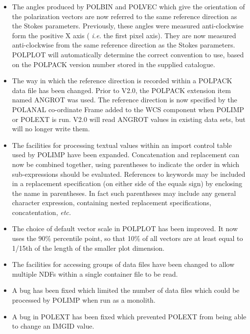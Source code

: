 \documentclass[twoside,11pt]{article}
\newcommand{\htmlref}[2]{#1}
\renewcommand{\_}{\texttt{\symbol{95}}}
\begin{document}
\begin{itemize}
\item The angles produced by \htmlref{POLBIN}{POLBIN} and
\htmlref{POLVEC}{POLVEC} which
give the orientation of the polarization vectors are now referred to the
same reference direction as the Stokes parameters. Previously, these
angles were measured anti-clockwise form the positive X axis (\emph{
i.e.} the first pixel axis). They are now measured anti-clockwise from
the same reference direction as the Stokes parameters.
\htmlref{POLPLOT}{POLPLOT}
will automatically determine the correct convention to use, based on the
POLPACK version number stored in the supplied catalogue.

\item The way in which the reference direction is recorded within a
POLPACK data file has been changed. Prior to V2.0, the POLPACK extension
item named ANGROT was used. The reference direction is now specified by
the POLANAL co-ordinate Frame added to the WCS component when
\htmlref{POLIMP}{POLIMP} or \htmlref{POLEXT}{POLIMP} is run. V2.0 will read 
ANGROT values in existing data sets, but will no longer write them.

\item The facilities for processing textual values within an import
control table used by \htmlref{POLIMP}{POLIMP} have been expanded.
Concatenation and replacement can now be combined together, using
parentheses to indicate the order in which sub-expressions should be
evaluated. References to keywords may be included in a replacement
specification (on either side of the equals sign) by enclosing the name 
in parentheses. In fact such parentheses may include any general
character expression, containing nested replacement specifications,
concatentation, \emph{etc.}

\item The choice of default vector scale in \htmlref{POLPLOT}{POLPLOT}
has been improved. It now uses the 90\% percentile point, so that 10\% of 
all vectors are at least equal to 1/15th of the length of the smaller plot
dimension.

\item The facilities for accessing groups of data files have been changed
to allow multiple NDFs within a single container file to be read. 

\item A bug has been fixed which limited the number of data files which 
could be processed by \htmlref{POLIMP}{POLIMP} when run as a monolith.

\item A bug in \htmlref{POLEXT}{POLEXT} has been fixed which prevented 
POLEXT from being able to change an IMGID value. 


\end{itemize}
\end{document}
